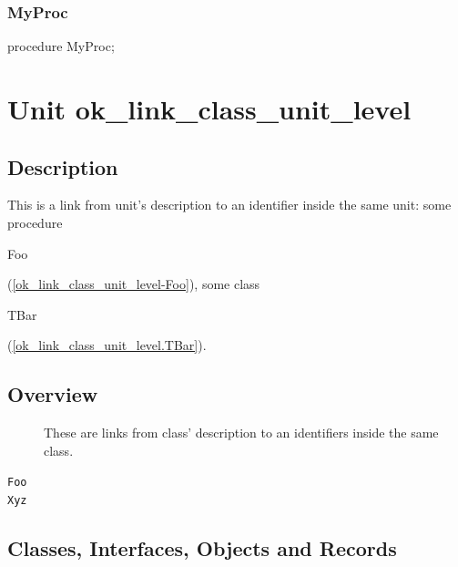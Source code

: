 \documentclass{report}
\begin{document}
\subsection*{MyProc}
\begin{list}{}{
\setlength{\itemindent}{0cm}
\setlength{\listparindent}{0cm}
\setlength{\leftmargin}{\evensidemargin}
\addtolength{\leftmargin}{\tmplength}
\settowidth{\labelsep}{X}
\addtolength{\leftmargin}{\labelsep}
\setlength{\labelwidth}{\tmplength}
}
\begin{flushleft}
\item[\textbf{Declaration}\hfill]
\begin{ttfamily}
procedure MyProc;\end{ttfamily}


\end{flushleft}
\end{list}
\chapter{Unit ok{\_}link{\_}class{\_}unit{\_}level}
\section{Description}
This is a link from unit's description to an identifier inside the same unit: some procedure \begin{ttfamily}Foo\end{ttfamily}(\ref{ok_link_class_unit_level-Foo}), some class \begin{ttfamily}TBar\end{ttfamily}(\ref{ok_link_class_unit_level.TBar}).
\section{Overview}
\begin{description}
\item[\texttt{\begin{ttfamily}TBar\end{ttfamily} Class}]These are links from class' description to an identifiers inside the same class.
\end{description}
\begin{description}
\item[\texttt{Foo}]
\item[\texttt{Xyz}]
\end{description}
\section{Classes, Interfaces, Objects and Records}
\end{document}

